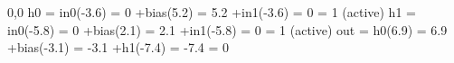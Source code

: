 \documentclass[11pt]{article}
\begin{document}
0,0\newline
h0 = in0(-3.6) = 0 \newline
    +bias(5.2) = 5.2 \newline
    +in1(-3.6) = 0 \newline
    = 1 (active)\newline
h1 = in0(-5.8) = 0 \newline
    +bias(2.1) = 2.1 \newline
    +in1(-5.8) = 0 \newline
    = 1 (active)\newline
out = h0(6.9) = 6.9 \newline
    +bias(-3.1) = -3.1 \newline
    +h1(-7.4) = -7.4 \newline
    = 0 \newline 
    
\end{document}
